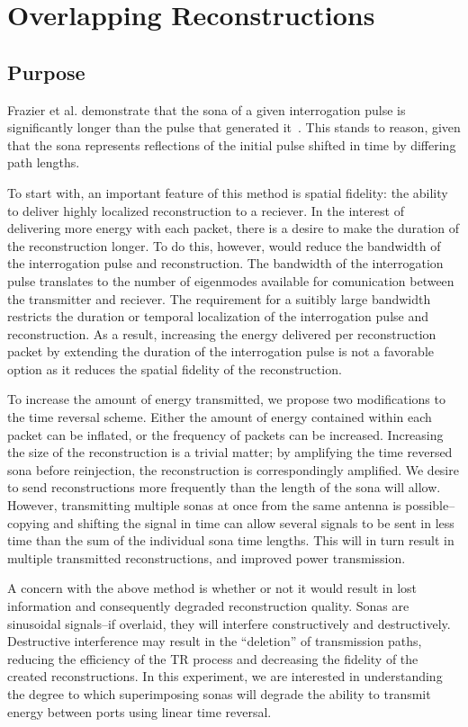 \section{Overlapping Reconstructions}
\label{sec:overlapping}

\subsection{Purpose}

Frazier et al. demonstrate that the sona of a given interrogation pulse is significantly longer than the pulse that generated it~\cite{nltr-wave-chaotic}. This stands to reason, given that the sona represents reflections of the initial pulse shifted in time by differing path lengths.

To start with, an important feature of this method is spatial fidelity: the ability to deliver highly localized reconstruction to a reciever. In the interest of delivering more energy with each packet, there is a desire to make the duration of the reconstruction longer. To do this, however, would reduce the bandwidth of the interrogation pulse and reconstruction. The bandwidth of the interrogation pulse translates to the number of eigenmodes available for comunication between the transmitter and reciever. The requirement for a suitibly large bandwidth restricts the duration or temporal localization of the interrogation pulse and reconstruction. As a result, increasing the energy delivered per reconstruction packet by extending the duration of the interrogation pulse is not a favorable option as it reduces the spatial fidelity of the reconstruction.

To increase the amount of energy transmitted, we propose two modifications to the time reversal scheme. Either the amount of energy contained within each packet can be inflated, or the frequency of packets can be increased. Increasing the size of the reconstruction is a trivial matter; by amplifying the time reversed sona before reinjection, the reconstruction is correspondingly amplified. We desire to send reconstructions more frequently than the length of the sona will allow. However, transmitting multiple sonas at once from the same antenna is possible--copying and shifting the signal in time can allow several signals to be sent in less time than the sum of the individual sona time lengths. This will in turn result in multiple transmitted reconstructions, and improved power transmission.

A concern with the above method is whether or not it would result in lost information and consequently degraded reconstruction quality. Sonas are sinusoidal signals--if overlaid, they will interfere constructively and destructively. Destructive interference may result in the ``deletion'' of transmission paths, reducing the efficiency of the TR process and decreasing the fidelity of the created reconstructions. In this experiment, we are interested in understanding the degree to which superimposing sonas will degrade the ability to transmit energy between ports using linear time reversal.

